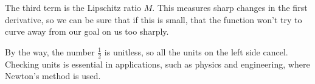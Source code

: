 \documentclass[12pt]{article}
\begin{document}
The third term is the Lipschitz ratio $M$. This measures sharp changes
in the first derivative, so we can be sure that if this is small, that
the function won't try to curve away from our goal on us too sharply.

By the way, the number $\frac{1}{2}$ is unitless, so all the units on
the left side cancel. Checking units is essential in applications,
such as physics and engineering, where Newton's method is used.


\end{document}
